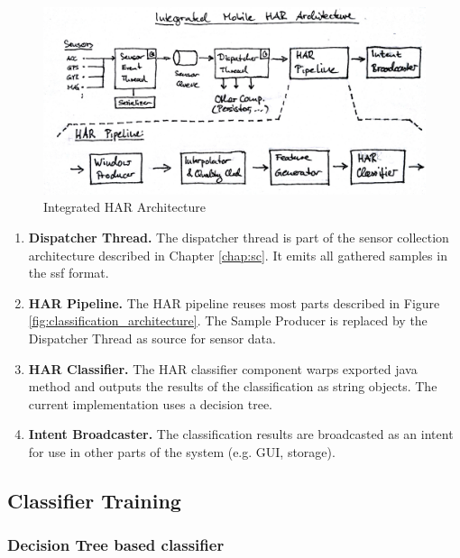 \begin{figure}[htbp]
\centering
\includegraphics[width=\textwidth]{img/har/integration.jpg}
\caption{Integrated HAR Architecture}\label{fig:integrated_har}
\end{figure}

\begin{enumerate}
\item {\bf Dispatcher Thread.} The dispatcher thread is part of
  the sensor collection architecture described in Chapter
  \ref{chap:sc}. It emits all gathered samples in the ssf format.
\item {\bf HAR Pipeline.} The HAR pipeline reuses most parts described
  in Figure \ref{fig:classification_architecture}. The Sample Producer
  is replaced by the Dispatcher Thread as source for sensor data.
\item {\bf HAR Classifier.} The HAR classifier component warps
  exported java method and outputs the results of the classification
  as string objects. The current implementation uses a decision tree.
\item {\bf Intent Broadcaster.} The classification results are
  broadcasted as an intent for use in other parts of the system
  (e.g. GUI, storage).
\end{enumerate}


\clearpage
\subsection{Classifier Training}\label{sec:har_classifier_training}



\subsubsection*{Decision Tree based classifier}
\label{sec:DectionTree}


